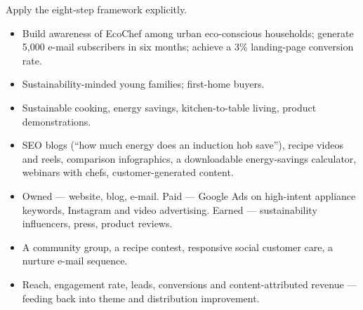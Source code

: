 \documentclass{MMTextbook}
\begin{document}
\begin{exambox}
Apply the eight-step framework explicitly.

\begin{itemize}
\item {} Build awareness of EcoChef among urban eco-conscious
      households; generate 5,000 e-mail subscribers in six months; achieve a
      3\% landing-page conversion rate.
\item {} Sustainability-minded young families; first-home buyers.
\item {} Sustainable cooking, energy savings, kitchen-to-table
      living, product demonstrations.
\item {} SEO blogs (``how much energy does an induction hob
      save''), recipe videos and reels, comparison infographics, a downloadable
      energy-savings calculator, webinars with chefs, customer-generated content.
\item {} Owned --- website, blog, e-mail. Paid --- Google Ads on
      high-intent appliance keywords, Instagram and video advertising. Earned ---
      sustainability influencers, press, product reviews.
\item {} A community group, a recipe contest, responsive social
      customer care, a nurture e-mail sequence.
\item {} Reach, engagement rate, leads, conversions and
      content-attributed revenue --- feeding back into theme and distribution
      improvement.
\end{itemize}
\end{exambox}
\end{document}
